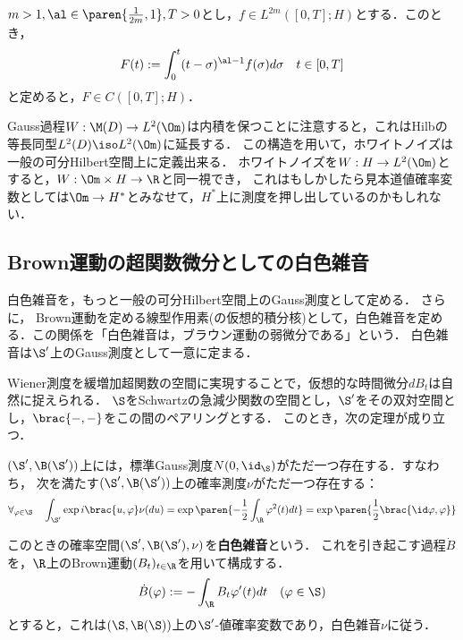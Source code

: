 \documentclass[uplatex,dvipdfmx]{jsreport}
\begin{document}
\begin{lemma}
    $m>1,\al\in\paren{\frac{1}{2m},1},T>0$とし，$f\in L^{2m}([0,T];H)$とする．このとき，
    \[F(t):=\int^t_0(t-\sigma)^{\al-1}f(\sigma)d\sigma\quad t\in[0,T]\]
    と定めると，$F\in C([0,T];H)$．
\end{lemma}

\begin{remarks}
    Gauss過程$W:\M(D)\to L^2(\Om)$は内積を保つことに注意すると，これはHilbの等長同型$L^2(D)\iso L^2(\Om)$に延長する．
    この構造を用いて，ホワイトノイズは一般の可分Hilbert空間上に定義出来る．
    ホワイトノイズを$W:H\to L^2(\Om)$とすると，$W:\Om\times H\to \R$と同一視でき，
    これはもしかしたら見本道値確率変数としては$\Om\to H^*$とみなせて，$H^*$上に測度を押し出しているのかもしれない．
\end{remarks}

\subsection{Brown運動の超関数微分としての白色雑音}

\begin{tcolorbox}[colframe=ForestGreen, colback=ForestGreen!10!white,breakable,colbacktitle=ForestGreen!40!white,coltitle=black,fonttitle=\bfseries\sffamily,
title=]
    白色雑音を，もっと一般の可分Hilbert空間上のGauss測度として定める．
    さらに，
    Brown運動を定める線型作用素(の仮想的積分核)として，白色雑音を定める．この関係を「白色雑音は，ブラウン運動の弱微分である」という．
    白色雑音は$\S'$上のGauss測度として一意に定まる．
\end{tcolorbox}

\begin{discussion}
    Wiener測度を緩増加超関数の空間に実現することで，仮想的な時間微分$dB_t$は自然に捉えられる．
    $\S$をSchwartzの急減少関数の空間とし，$\S'$をその双対空間とし，$\brac{-,-}$をこの間のペアリングとする．
    このとき，次の定理が成り立つ．
    \begin{theorem}[白色雑音の存在定理]\label{thm-existence-of-white-noise}
        $(\S',\B(\S'))$上には，標準Gauss測度$N(0,\id_{\S})$がただ一つ存在する．すなわち，
        次を満たす$(\S',\B(\S'))$上の確率測度$\nu$がただ一つ存在する：
        \[\forall_{\varphi\in\S}\quad\int_{\S'}\exp{i\brac{u,\varphi}}\nu(du)=\exp\paren{-\frac{1}{2}\int_\R\varphi^2(t)dt}=\exp\paren{\frac{1}{2}\brac{\id\varphi,\varphi}}\]
    \end{theorem}
    このときの確率空間$(\S',\B(\S'),\nu)$を\textbf{白色雑音}という．
    これを引き起こす過程$\dot{B}$を，$\R$上のBrown運動$(B_t)_{t\in\R}$を用いて構成する．
    \[\dot{B}(\varphi):=-\int_\R B_t\varphi'(t)dt\quad(\varphi\in\S)\]
    とすると，これは$(\S,\B(\S))$上の$\S'$-値確率変数であり，白色雑音$\nu$に従う．
\end{discussion}
\end{document}
